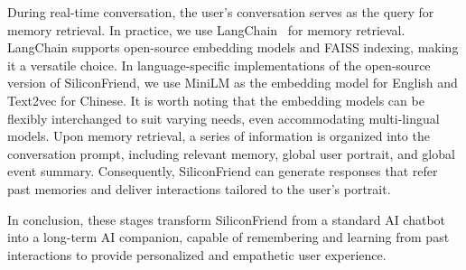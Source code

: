 During real-time conversation, the user's conversation serves as the query for memory retrieval. In practice, we use LangChain~\citep{langchain} for memory retrieval. LangChain supports open-source embedding models and FAISS indexing, making it a versatile choice.
In language-specific implementations of the open-source version of SiliconFriend, we use MiniLM \citep{wang2020minilm} as the  embedding model for English and Text2vec \citep{text2vec} for Chinese. It is worth noting that the embedding models can be flexibly interchanged to suit varying needs, even accommodating multi-lingual models.
Upon memory retrieval, a series of information is organized into the conversation prompt, including relevant memory, global user portrait, and global event summary. Consequently, SiliconFriend can generate responses that refer past memories and deliver interactions tailored to the user's portrait.

In conclusion, these stages transform SiliconFriend from a standard AI chatbot into a long-term AI companion, capable of remembering and learning from past interactions to provide  personalized and empathetic user experience.